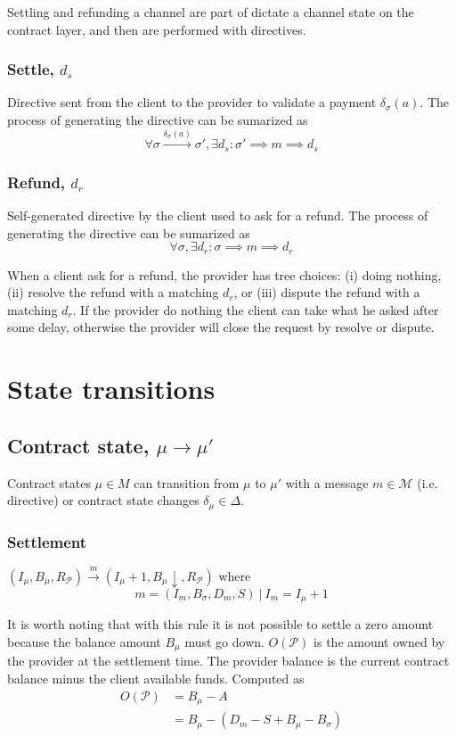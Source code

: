 \documentclass{llncs}
\begin{document}
Settling and refunding a channel are part of dictate a channel state on the contract layer, and then are performed with directives.

\subsubsection{Settle, $d_s$} Directive sent from the client to the provider to validate a payment $\delta_\sigma(a)$. The process of generating the directive can be sumarized as
$$\forall \sigma \xrightarrow{\delta_\sigma(a)} \sigma', \exists d_s : \sigma' \implies m \implies d_s$$

\subsubsection{Refund, $d_r$} Self-generated directive by the client used to ask for a refund. The process of generating the directive can be sumarized as
$$\forall \sigma, \exists d_r : \sigma \implies m \implies d_r$$

When a client ask for a refund, the provider has tree choices: (i) doing nothing, (ii) resolve the refund with a matching $d_r$, or (iii) dispute the refund with a matching $d_r$. If the provider do nothing the client can take what he asked after some delay, otherwise the provider will close the request by resolve or dispute.

\section{State transitions}

\subsection{Contract state, $\mu \rightarrow \mu'$} Contract states $\mu \in M$ can transition from $\mu$ to $\mu'$ with a message $m \in \mathcal{M}$ (i.e. directive) or contract state changes $\delta_\mu \in \Delta$.

\subsubsection{Settlement} $(I_\mu, B_\mu, R_\mathcal{P}) \xrightarrow{m} (I_\mu+1, B_\mu\downarrow, R_\mathcal{P})$ where
$$m = (I_m, B_\sigma, D_m, S)\ |\ I_m = I_\mu+1$$

It is worth noting that with this rule it is not possible to settle a zero amount because the balance amount $B_\mu$ must go down. $O(\mathcal{P})$ is the amount owned by the provider at the settlement time. The provider balance is the current contract balance minus the client available funds. Computed as
\begin{equation*}
\begin{split}
    O(\mathcal{P}) &= B_\mu - A \\
    &= B_\mu - (D_m - S + B_\mu - B_\sigma) \\
\end{split}
\end{equation*}
\end{document}
